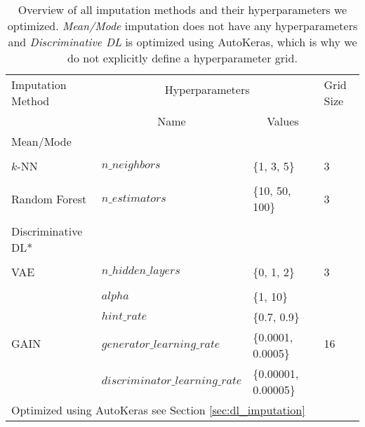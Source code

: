 \begin{table}[]
	\centering
	\begin{tabular}{@{}llll@{}}
		\toprule
		\multirow{2}{*}{Imputation Method} & \multicolumn{2}{c}{Hyperparameters}                          & \multirow{2}{*}{Grid Size} \\\cline{2-3}
		\\[-0.75em]
		& \multicolumn{1}{c}{Name}        & \multicolumn{1}{c}{Values} &                            \\ \midrule
		Mean/Mode                         &                                 &                            &                           \\
		\\[-0.5em]
		$k$-NN                             & $n\_neighbors$                  & \{1, 3, 5\}                & 3                          \\
		\\[-0.5em]
		Random Forest                      & $n\_estimators$                 & \{10, 50, 100\}            & 3                          \\
		\\[-0.5em]
		Discriminative DL*                   &                                 &                            &                            \\
		\\[-0.5em]
		VAE                                & $n\_hidden\_layers$             & \{0, 1, 2\}                & 3                          \\
		\\[-0.5em]
		\multirow{4}{*}{GAIN}              & $alpha$                         & \{1, 10\}                  & \multirow{4}{*}{16}        \\
		& $hint\_rate$                    & \{0.7, 0.9\}               &                            \\
		& $generator\_learning\_rate$     & \{0.0001, 0.0005\}         &                            \\
		& $discriminator\_learning\_rate$ & \{0.00001, 0.00005\}       &                            \\ \bottomrule
		\multicolumn{4}{l}{\footnotesize*Optimized using AutoKeras see Section \ref{sec:dl_imputation}}
	\end{tabular}
	\caption{Overview of all imputation methods and their hyperparameters we optimized. \emph{Mean/Mode} imputation does not have any hyperparameters and \emph{Discriminative DL} is optimized using AutoKeras, which is why we do not explicitly define a hyperparameter grid.}
	\label{tab:HPO}
\end{table}



